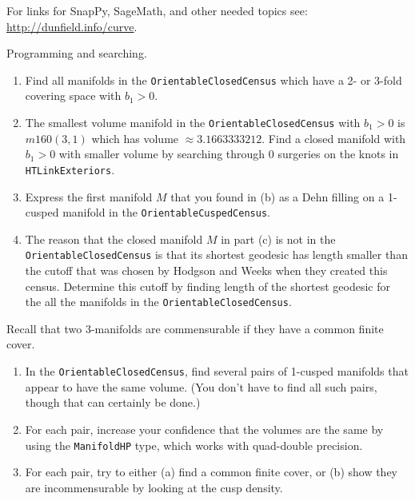 \documentclass[tikz, a4paper]{nmd/hw}
\begin{document}

For links for SnapPy, SageMath, and other needed topics see: \url{http://dunfield.info/curve}.

\begin{problems}
  \item Programming and searching.
    \begin{enumerate}
      \item Find all manifolds in the \texttt{OrientableClosedCensus}
        which have a 2- or 3-fold covering space with $b_1 > 0$.  
      \item The smallest volume manifold in the
        \texttt{OrientableClosedCensus} with $b_1 > 0$ is $m160(3,1)$
        which has volume $\approx 3.1663333212$.  Find a closed
        manifold with $b_1 > 0$ with smaller volume by searching
        through 0 surgeries on the knots in \texttt{HTLinkExteriors}.  

      \item Express the first manifold $M$ that you found in (b) as a
        Dehn filling on a 1-cusped manifold in the
        \texttt{OrientableCuspedCensus}.  

      \item The reason that the closed manifold $M$ in part (c) is not
        in the \texttt{OrientableClosedCensus} is that its shortest
        geodesic has length smaller than the cutoff that was chosen by
        Hodgson and Weeks when they created this census.  Determine
        this cutoff by finding length of the shortest geodesic for the
        all the manifolds in the \texttt{OrientableClosedCensus}.
    \end{enumerate}

\item Recall that two 3-manifolds are commensurable if they have a
  common finite cover.  
  \begin{enumerate}
  \item In the \texttt{OrientableClosedCensus}, find several pairs of
    1-cusped manifolds that appear to have the same volume. (You don't
    have to find all such pairs, though that can certainly be done.)

  \item For each pair, increase your confidence that the volumes are
    the same by using the \texttt{ManifoldHP} type, which works with
    quad-double precision.

    \item For each pair, try to either (a) find a common finite cover,
      or (b) show they are incommensurable by looking at the cusp
      density.  
  \end{enumerate}


\end{problems}
\end{document}
